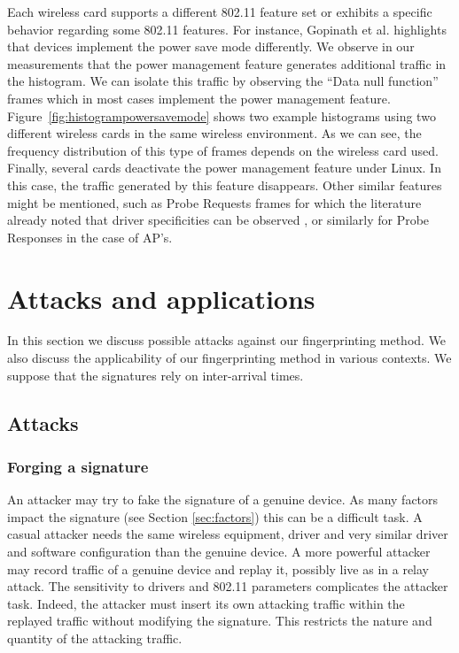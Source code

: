 \documentclass[10pt, conference, compsocconf, letterpaper]{IEEEtran}
\begin{document}
Each wireless card supports a different 802.11 feature set or exhibits a specific behavior regarding some 802.11 features. 
For instance, Gopinath et al. \cite{Gopinath:WiNTECH} highlights that devices implement
the power save mode differently. 
We observe in our measurements that the power management feature generates additional traffic
in the histogram. We can isolate this traffic by observing the ``Data null function'' frames
which in most cases implement the power management feature. 
Figure~\ref{fig:histogrampowersavemode} shows two example histograms using two different wireless cards 
in the same wireless environment.
As we can see, the frequency distribution of this type of frames depends on the wireless card used.
Finally, several cards deactivate the power management feature under Linux. In this case, the traffic generated by this feature disappears.
Other similar features might be mentioned, such as Probe Requests frames
for which the literature already noted that driver specificities can be observed \cite{Franklin:Security06},
or similarly for Probe Responses in the case of AP's.











\section{Attacks and applications}
\label{sec:app}
In this section we discuss possible attacks against our fingerprinting method. We also discuss the applicability of our fingerprinting method in various contexts. We suppose that the signatures rely on inter-arrival times.


\subsection{Attacks}

\subsubsection{Forging a signature}
An attacker may try to fake the signature of a genuine device.
As many factors impact the signature (see Section \ref{sec:factors}) this can be a difficult task.
A casual attacker needs the same wireless equipment, driver and very similar driver and software configuration than the genuine device.
A more powerful attacker may record traffic of a genuine device and replay it, possibly live as in a relay attack.
The sensitivity to drivers and 802.11 parameters complicates the attacker task.
Indeed, the attacker must insert its own attacking traffic within the replayed traffic without modifying the signature.
This restricts the nature and quantity of the attacking traffic.
\end{document}
